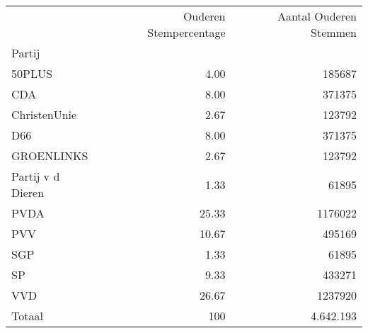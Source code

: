 \begin{tabular}{lrr}
\toprule
{} &  Ouderen Stempercentage &  Aantal Ouderen Stemmen \\
Partij                &                         &                         \\
\midrule
50PLUS                &                    4.00 &                  185687 \\
CDA                   &                    8.00 &                  371375 \\
ChristenUnie          &                    2.67 &                  123792 \\
D66                   &                    8.00 &                  371375 \\
GROENLINKS            &                    2.67 &                  123792 \\
Partij v d Dieren &                    1.33 &                   61895 \\
PVDA                  &                   25.33 &                 1176022 \\
PVV                   &                   10.67 &                  495169 \\
SGP                   &                    1.33 &                   61895 \\
SP                    &                    9.33 &                  433271 \\
VVD                   &                   26.67 &                 1237920 \\
\midrule
Totaal                &                     100 &				4.642.193 \\
\bottomrule
\end{tabular}
